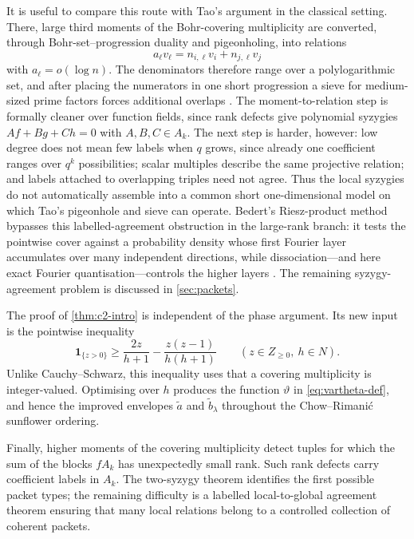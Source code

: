 \documentclass[11pt,reqno]{amsart}
\numberwithin{equation}{section}
\theoremstyle{definition}
\theoremstyle{remark}
\newcommand{\one}{\mathbf 1}
\def\mathbb#1{#1}%
\begin{document}
It is useful to compare this route with Tao's argument in the classical setting.  There, large third moments of the Bohr-covering multiplicity are converted, through Bohr-set--progression duality and pigeonholing, into relations
\[
 a_\ell v_\ell=n_{i,\ell}v_i+n_{j,\ell}v_j
\]
with $a_\ell=o(\log n)$.  The denominators therefore range over a polylogarithmic set, and after placing the numerators in one short progression a sieve for medium-sized prime factors forces additional overlaps \cite{Tao}.  The moment-to-relation step is formally cleaner over function fields, since rank defects give polynomial syzygies $Af+Bg+Ch=0$ with $A,B,C\in A_k$.  The next step is harder, however: low degree does not mean few labels when $q$ grows, since already one coefficient ranges over $q^k$ possibilities; scalar multiples describe the same projective relation; and labels attached to overlapping triples need not agree.  Thus the local syzygies do not automatically assemble into a common short one-dimensional model on which Tao's pigeonhole and sieve can operate.  Bedert's Riesz-product method bypasses this labelled-agreement obstruction in the large-rank branch: it tests the pointwise cover against a probability density whose first Fourier layer accumulates over many independent directions, while dissociation---and here exact Fourier quantisation---controls the higher layers \cite{Bedert}.  The remaining syzygy-agreement problem is discussed in \cref{sec:packets}.

The proof of \cref{thm:c2-intro} is independent of the phase argument.  Its new input is the pointwise inequality
\begin{equation}\label{eq:integer-multiplicity-intro}
 \one_{\{z>0\}}
 \ge
 \frac{2z}{h+1}
 -\frac{z(z-1)}{h(h+1)}
 \qquad
 (z\in\mathbb Z_{\ge0},\ h\in\mathbb N).
\end{equation}
Unlike Cauchy--Schwarz, this inequality uses that a covering multiplicity is integer-valued.  Optimising over $h$ produces the function $\vartheta$ in \eqref{eq:vartheta-def}, and hence the improved envelopes
$\widetilde a$ and $\widetilde b_\lambda$ throughout the Chow--Rimani\'c sunflower ordering.

Finally, higher moments of the covering multiplicity detect tuples for which the sum of the blocks $fA_k$ has unexpectedly small rank.  Such rank defects carry coefficient labels in $A_k$.  The two-syzygy theorem identifies the first possible packet types; the remaining difficulty is a labelled local-to-global agreement theorem ensuring that many local relations belong to a controlled collection of coherent packets.
\end{document}
